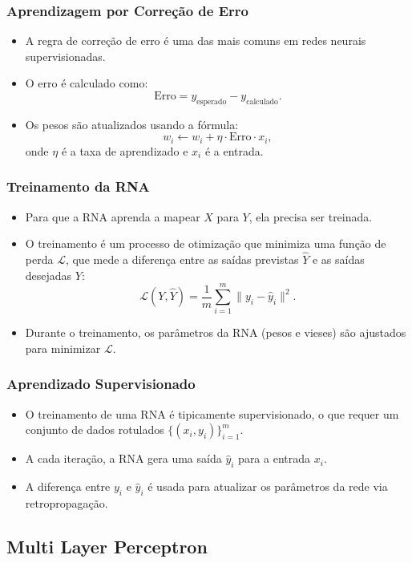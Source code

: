 \documentclass[aspectratio=169]{beamer}
\begin{document}
\begin{frame}
\frametitle{Aprendizagem por Correção de Erro}
\begin{itemize}
    \item A regra de correção de erro é uma das mais comuns em redes neurais supervisionadas.
    \item O erro é calculado como:
    \[
    \text{Erro} = y_{\text{esperado}} - y_{\text{calculado}}.
    \]
    \item Os pesos são atualizados usando a fórmula:
    \[
    w_i \leftarrow w_i + \eta \cdot \text{Erro} \cdot x_i,
    \]
    onde \( \eta \) é a taxa de aprendizado e \( x_i \) é a entrada.
\end{itemize}
\end{frame}

\begin{frame}
\frametitle{Treinamento da RNA}
\begin{itemize}
    \item Para que a RNA aprenda a mapear \( X \) para \( Y \), ela precisa ser treinada.
    \item O treinamento é um processo de otimização que minimiza uma função de perda \( \mathcal{L} \), que mede a diferença entre as saídas previstas \( \hat{Y} \) e as saídas desejadas \( Y \):
    \[
    \mathcal{L}(Y, \hat{Y}) = \frac{1}{m} \sum_{i=1}^m \| y_i - \hat{y}_i \|^2.
    \]
    \item Durante o treinamento, os parâmetros da RNA (pesos e vieses) são ajustados para minimizar \( \mathcal{L} \).
\end{itemize}
\end{frame}

\begin{frame}
\frametitle{Aprendizado Supervisionado}
\begin{itemize}
    \item O treinamento de uma RNA é tipicamente supervisionado, o que requer um conjunto de dados rotulados \( \{(x_i, y_i)\}_{i=1}^m \).
    \item A cada iteração, a RNA gera uma saída \( \hat{y}_i \) para a entrada \( x_i \).
    \item A diferença entre \( y_i \) e \( \hat{y}_i \) é usada para atualizar os parâmetros da rede via retropropagação.
\end{itemize}
\end{frame}


\subsection{Multi Layer Perceptron}
\end{document}
